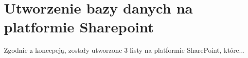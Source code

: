 \section{Utworzenie bazy danych na platformie Sharepoint}

Zgodnie z koncepcją, zostały utworzone 3 listy na platformie SharePoint, które...